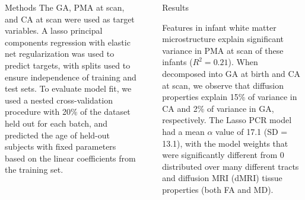 \documentclass[final]{beamer}
\newlength{\sepwidth}
\newlength{\colwidth}
\newcommand{\separatorcolumn}{\begin{column}{\sepwidth}\end{column}}
\begin{document}
\begin{frame}[t]
\begin{columns}[t]
\begin{column}{\colwidth}
\begin{block}{Methods}
    The GA, PMA at scan, and CA at scan were used as target variables. A lasso principal components regression with elastic net regularization was used to predict targets, with splits used to ensure independence of training and test sets. To evaluate model fit, we used a nested cross-validation procedure with 20\% of the dataset held out for each batch, and predicted the age of held-out subjects with fixed parameters based on the linear coefficients from the training set.

    \vspace{20pt}
  \end{block}

\end{column}

\separatorcolumn

\begin{column}{\colwidth}

  \begin{block}{Results}

    Features in infant white matter microstructure explain significant variance in PMA at scan of these infants ($R^2 = 0.21$). When decomposed into GA at birth and CA at scan, we observe that diffusion properties explain 15\% of variance in CA and 2\% of variance in GA, respectively. The Lasso PCR model had a mean $\alpha$ value of 17.1 (SD = 13.1), with the model weights that were significantly different from 0 distributed over many different tracts and diffusion MRI (dMRI) tissue properties (both FA and MD).


\end{block}
\end{column}
\end{columns}
\end{frame}
\end{document}
